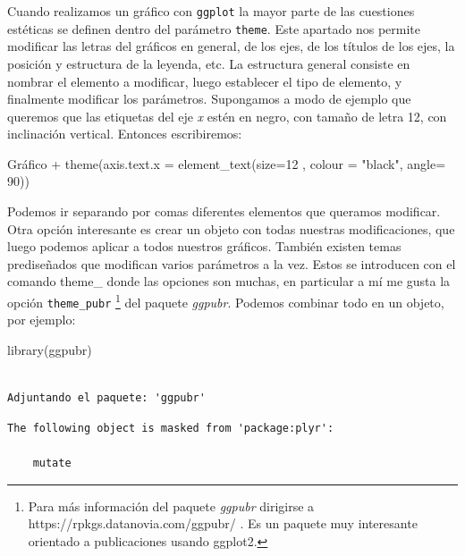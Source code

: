 \documentclass[
  letterpaper,
  DIV=11,
  numbers=noendperiod]{scrartcl}
\newenvironment{Shaded}{\begin{snugshade}}{\end{snugshade}}
\newcommand{\AttributeTok}[1]{\textcolor[rgb]{0.40,0.45,0.13}{#1}}
\newcommand{\DecValTok}[1]{\textcolor[rgb]{0.68,0.00,0.00}{#1}}
\newcommand{\FunctionTok}[1]{\textcolor[rgb]{0.28,0.35,0.67}{#1}}
\newcommand{\NormalTok}[1]{\textcolor[rgb]{0.00,0.23,0.31}{#1}}
\newcommand{\SpecialCharTok}[1]{\textcolor[rgb]{0.37,0.37,0.37}{#1}}
\newcommand{\StringTok}[1]{\textcolor[rgb]{0.13,0.47,0.30}{#1}}
\begin{document}
Cuando realizamos un gráfico con \texttt{ggplot} la mayor parte de las
cuestiones estéticas se definen dentro del parámetro \texttt{theme}.
Este apartado nos permite modificar las letras del gráficos en general,
de los ejes, de los títulos de los ejes, la posición y estructura de la
leyenda, etc. La estructura general consiste en nombrar el elemento a
modificar, luego establecer el tipo de elemento, y finalmente modificar
los parámetros. Supongamos a modo de ejemplo que queremos que las
etiquetas del eje \emph{x} estén en negro, con tamaño de letra 12, con
inclinación vertical. Entonces escribiremos:

\begin{Shaded}
\begin{Highlighting}[]
\NormalTok{Gráfico }\SpecialCharTok{+}
  \FunctionTok{theme}\NormalTok{(}\AttributeTok{axis.text.x =} \FunctionTok{element\_text}\NormalTok{(}\AttributeTok{size=}\DecValTok{12}\NormalTok{ ,}
                                   \AttributeTok{colour =} \StringTok{"black"}\NormalTok{,}
                                   \AttributeTok{angle=} \DecValTok{90}\NormalTok{))}
\end{Highlighting}
\end{Shaded}

Podemos ir separando por comas diferentes elementos que queramos
modificar. Otra opción interesante es crear un objeto con todas nuestras
modificaciones, que luego podemos aplicar a todos nuestros gráficos.
También existen temas prediseñados que modifican varios parámetros a la
vez. Estos se introducen con el comando theme\_ donde las opciones son
muchas, en particular a mí me gusta la opción \texttt{theme\_pubr}
\footnote{Para más información del paquete \emph{ggpubr} dirigirse a
  https://rpkgs.datanovia.com/ggpubr/ . Es un paquete muy interesante
  orientado a publicaciones usando ggplot2.} del paquete \emph{ggpubr}.
Podemos combinar todo en un objeto, por ejemplo:

\begin{Shaded}
\begin{Highlighting}[]
\FunctionTok{library}\NormalTok{(ggpubr)}
\end{Highlighting}
\end{Shaded}

\begin{verbatim}

Adjuntando el paquete: 'ggpubr'
\end{verbatim}

\begin{verbatim}
The following object is masked from 'package:plyr':

    mutate
\end{verbatim}
\end{document}
